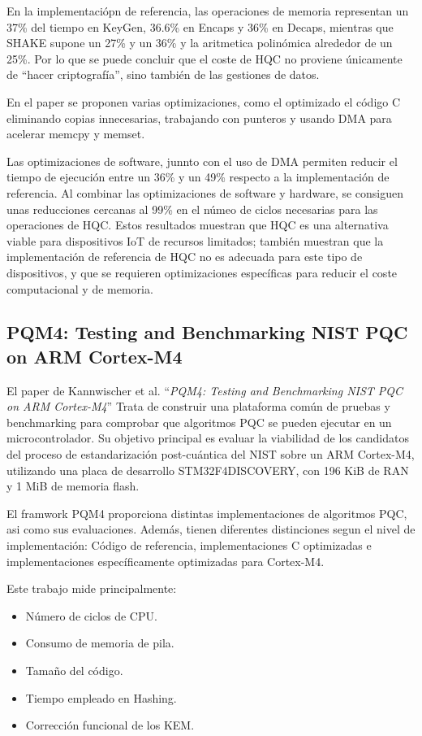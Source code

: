     En la implementaciópn de referencia, las operaciones de memoria representan un 37\% del tiempo 
    en KeyGen, 36.6\% en Encaps y 36\% en Decaps, mientras que SHAKE supone un 27\% y un 36\% y la aritmetica
    polinómica alrededor de un 25\%. Por lo que se puede concluir que el coste de HQC no proviene únicamente
    de ``hacer criptografía'', sino también de las gestiones de datos. 

    En el paper se proponen varias optimizaciones, como el optimizado el código C eliminando 
    copias innecesarias, trabajando con punteros y usando DMA para acelerar memcpy y memset. 

    Las optimizaciones de software, junnto con el uso de DMA permiten reducir el tiempo de ejecución 
    entre un 36\% y un 49\% respecto a la implementación de referencia. Al combinar las optimizaciones
    de software y hardware, se consiguen unas reducciones cercanas al 99\% en el númeo de ciclos necesarias
    para las operaciones de HQC. Estos resultados muestran que HQC es una alternativa viable para dispositivos
    IoT de recursos limitados; también muestran que la implementación de referencia de HQC no es adecuada para 
    este tipo de dispositivos, y que se requieren optimizaciones específicas para reducir el coste computacional y de memoria.


    \subsection{PQM4: Testing and Benchmarking NIST PQC on ARM Cortex-M4}

    El paper de Kannwischer et al. ``\textit{PQM4: Testing and Benchmarking NIST PQC on ARM Cortex-M4}'' \cite{kannwischer_pqm4_2020} Trata de construir 
    una plataforma común de pruebas y benchmarking para comprobar que algoritmos PQC se pueden ejecutar en un microcontrolador. Su objetivo principal es evaluar la viabilidad de los candidatos del proceso de estandarización post-cuántica del NIST sobre un ARM Cortex-M4, utilizando
    una placa de desarrollo STM32F4DISCOVERY, con 196 KiB de RAN y 1 MiB de memoria flash. 
    
    El framwork PQM4 proporciona distintas implementaciones de algoritmos PQC, asi como sus evaluaciones. Además, tienen diferentes distinciones 
    segun el nivel de implementación: Código de referencia, implementaciones C optimizadas e implementaciones específicamente optimizadas
    para Cortex-M4. 

    Este trabajo mide principalmente: 
    \begin{itemize}
        \item Número de ciclos de CPU.
        \item Consumo de memoria de pila.
        \item Tamaño del código.
        \item Tiempo empleado en Hashing. 
        \item Corrección funcional de los KEM.
    \end{itemize}

